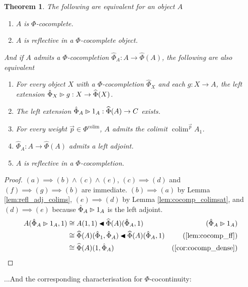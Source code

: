 \documentclass[10pt,a4paper]{article}
\newcommand{\coce}[2]{{\hat{#1}}_{#2}}
\newcommand{\coc}[2]{{\widehat{#1}}(#2)}
\newcommand{\plext}{\mathbin{{\rhd}\mathclap{\mspace{-17.5mu}\cdot}}}
\newcommand{\rift}{\mathbin{\blacktriangleleft}}
\newcommand{\simeqq}{\cong}
\DeclareMathOperator{\colim}{colim}
\theoremstyle{plain}
\newtheorem{theorem}{Theorem}[subsection]
\theoremstyle{definition}
\theoremstyle{remark}
\begin{document}
\begin{theorem}
    \label{th:cocomp_tests}
    The following are equivalent for an object $A$
    \begin{enumerate}
        \item $A$ is $\Phi$-cocomplete.
        \item $A$ is reflective in a $\Phi$-cocomplete object.
    \end{enumerate}
    And if $A$ admits a $\Phi$-cocompletion $\coce\Phi A : A \to \coc\Phi A$, the following are also equivalent
    \begin{enumerate}[resume]
        \item For every object $X$ with a $\Phi$-cocompletion $\coce\Phi X$ and each $g : X \to A$, the left extension $\coce\Phi X \plext g : X \to \coc\Phi X$.
        \item The left extension $\coce\Phi A \plext 1_A : \coc\Phi A \to C$ exists.
        \item For every weight $\vec p\in\Phi^{\colim}$, $A$ admits the colimit $\colim^{\vec p}A_1$.
        \item $\coce\Phi A : A \to \coc\Phi A$ admits a left adjoint.
        \item $A$ is reflective in a $\Phi$-cocompletion.
    \end{enumerate}
\end{theorem}

\begin{proof}
    $(a)\implies (b)\land(c)\land(e)$, $(c)\implies(d)$ and $(f)\implies(g)\implies(b)$ are immediate. $(b)\implies(a)$ by Lemma \ref{lem:refl_adj_colims}, $(e)\implies(d)$ by Lemma \ref{lem:cocomp_colimsat}, and $(d)\implies(e)$ because $\coce\Phi A\plext 1_A$ is the left adjoint.
    \begin{align*}
        A(\coce\Phi A\plext 1_A, 1) &\simeqq A(1, 1)\rift \coc\Phi A(\coce\Phi A, 1) & (\coce\Phi A\plext 1_A)\\
                                    &\simeqq \coc\Phi A(\coce\Phi 1, \coce\Phi A)\rift\coc\Phi A(\coce\Phi A, 1) & (\ref{lem:cocomp_ff})\\
                                    &\simeqq \coc\Phi A(1, \coce\Phi A) & (\ref{cor:cocomp_dense})
    \end{align*}
\end{proof}

...And the corresponding characterisation for $\Phi$-cocontinuity:
\end{document}
